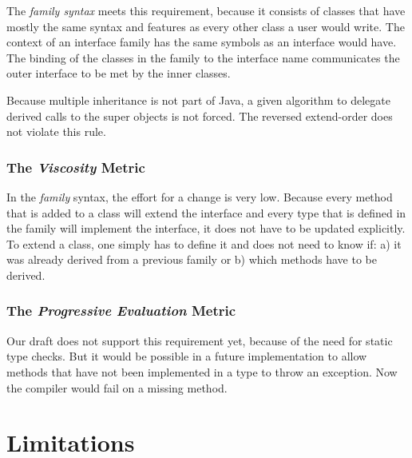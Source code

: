 \documentclass{report}
\begin{document}
The \emph{family syntax} meets this requirement, because it consists of classes that have mostly the same syntax and features as every other class a user would write. The context of an interface family has the same symbols as an interface would have. The binding of the classes in the family to the interface name communicates the outer interface to be met by the inner classes.

Because multiple inheritance is not part of Java, a given algorithm to delegate derived calls to the super objects is not forced. The reversed extend-order does not violate this rule.

\subsubsection*{The \emph{Viscosity} Metric}

In the \emph{family} syntax, the effort for a change is very low. Because every method that is added to a class will extend the interface and every type that is defined in the family will implement the interface, it does not have to be updated explicitly. To extend a class, one simply has to define it and does not need to know if: a) it was already derived from a previous family or b) which methods have to be derived.

\subsubsection*{The \emph{Progressive Evaluation} Metric}

Our draft does not support this requirement yet, because of the need for static type checks. But it would be possible in a future implementation to allow methods that have not been implemented in a type to throw an exception. Now the compiler would fail on a missing method.











\label{syntaxExtensionEP}




\section{Limitations}
\label{syntaxExtensionLimitations}
\end{document}
